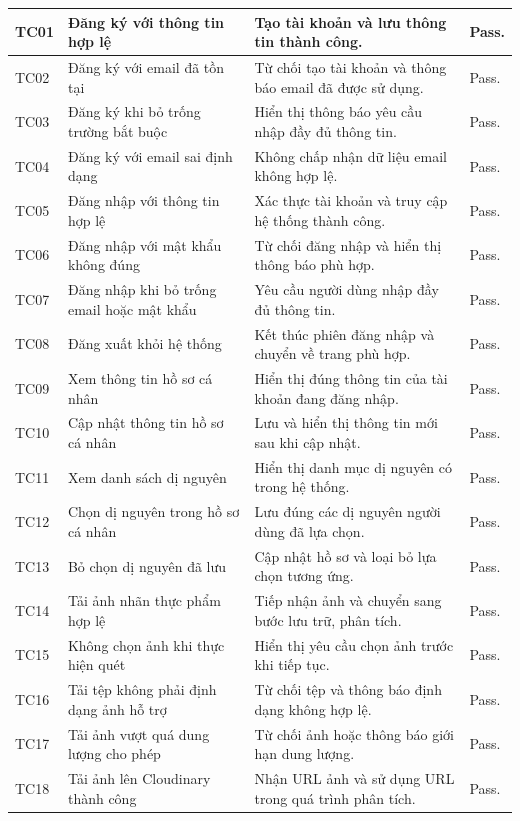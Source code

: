 \begin{longtable}{|>{\centering\arraybackslash}p{0.8cm}|>{\raggedright\arraybackslash}p{3.1cm}|>{\raggedright\arraybackslash}p{8.2cm}|>{\raggedright\arraybackslash}p{2.2cm}|}
	\hline
	\endlastfoot
	TC01 & Đăng ký với thông tin hợp lệ & Tạo tài khoản và lưu thông tin thành công. & Pass. \\ \hline
	TC02 & Đăng ký với email đã tồn tại & Từ chối tạo tài khoản và thông báo email đã được sử dụng. & Pass. \\ \hline
	TC03 & Đăng ký khi bỏ trống trường bắt buộc & Hiển thị thông báo yêu cầu nhập đầy đủ thông tin. & Pass. \\ \hline
	TC04 & Đăng ký với email sai định dạng & Không chấp nhận dữ liệu email không hợp lệ. &Pass. \\ \hline
	TC05 & Đăng nhập với thông tin hợp lệ & Xác thực tài khoản và truy cập hệ thống thành công. & Pass. \\ \hline
	TC06 & Đăng nhập với mật khẩu không đúng & Từ chối đăng nhập và hiển thị thông báo phù hợp. & Pass. \\ \hline
	TC07 & Đăng nhập khi bỏ trống email hoặc mật khẩu & Yêu cầu người dùng nhập đầy đủ thông tin. & Pass. \\ \hline
	TC08 & Đăng xuất khỏi hệ thống & Kết thúc phiên đăng nhập và chuyển về trang phù hợp. & Pass. \\ \hline
	TC09 & Xem thông tin hồ sơ cá nhân & Hiển thị đúng thông tin của tài khoản đang đăng nhập. &Pass. \\ \hline
	TC10 & Cập nhật thông tin hồ sơ cá nhân & Lưu và hiển thị thông tin mới sau khi cập nhật. & Pass. \\ \hline
	TC11 & Xem danh sách dị nguyên & Hiển thị danh mục dị nguyên có trong hệ thống. & Pass. \\ \hline
	TC12 & Chọn dị nguyên trong hồ sơ cá nhân & Lưu đúng các dị nguyên người dùng đã lựa chọn. &Pass. \\ \hline
	TC13 & Bỏ chọn dị nguyên đã lưu & Cập nhật hồ sơ và loại bỏ lựa chọn tương ứng. & Pass. \\ \hline
	TC14 & Tải ảnh nhãn thực phẩm hợp lệ & Tiếp nhận ảnh và chuyển sang bước lưu trữ, phân tích. & Pass. \\ \hline
	TC15 & Không chọn ảnh khi thực hiện quét & Hiển thị yêu cầu chọn ảnh trước khi tiếp tục. & Pass. \\ \hline
	TC16 & Tải tệp không phải định dạng ảnh hỗ trợ & Từ chối tệp và thông báo định dạng không hợp lệ. &Pass. \\ \hline
	TC17 & Tải ảnh vượt quá dung lượng cho phép & Từ chối ảnh hoặc thông báo giới hạn dung lượng. & Pass. \\ \hline
	TC18 & Tải ảnh lên Cloudinary thành công & Nhận URL ảnh và sử dụng URL trong quá trình phân tích. &Pass. \\ \hline

\end{longtable}
